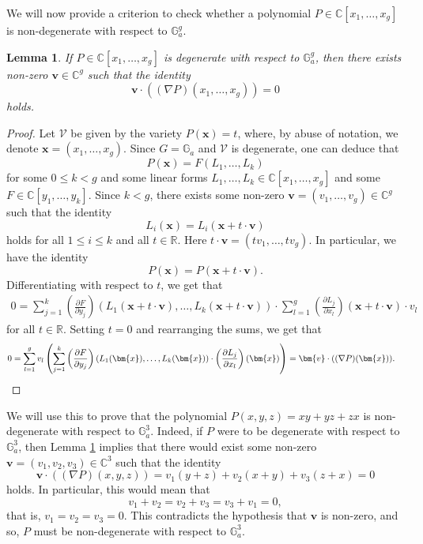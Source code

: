 \documentclass[12pt, reqno]{amsart}
\newcommand{\G}{\mathbb{G}}
\renewcommand{\vec}[1]{\mathbf{#1}}
\renewcommand{\vec}{\bm}
\newtheorem{lemma}[theorem]{Lemma}
\theoremstyle{remark}
\theoremstyle{definition}
\numberwithin{equation}{section}
\begin{document}
We will now provide a criterion to check whether a polynomial $P \in \mathbb{C}[x_1, \dots, x_g]$ is non-degenerate with respect to $\mathbb{G}_a^g$.


\begin{lemma} \label{degenequiv}
    If $P \in \mathbb{C}[x_1, \dots, x_g]$ is degenerate with respect to $\mathbb{G}_a^g$, then there exists non-zero $\vec{v} \in \mathbb{C}^g$ such that the identity
    \[ \vec{v} \cdot (( \nabla P)(x_1, \dots, x_g)) = 0\]
    holds. 
\end{lemma}
\begin{proof}
Let $\mathcal{V}$ be given by the variety $P(\vec{x}) = t$, where, by abuse of notation, we denote $\vec{x} = (x_1, \dots, x_g)$. Since $G = \mathbb{G}_a$ and $\mathcal{V}$ is degenerate, one can deduce that 
\[ P(\vec{x}) = F(L_1, \dots, L_k)\]
for some $0 \leq k < g$ and some linear forms $L_1, \dots, L_k \in \mathbb{C}[x_1, \dots, x_g]$ and some $F \in \mathbb{C}[y_1, \dots, y_k]$. Since $k < g$, there exists some non-zero $\vec{v} = (v_1, \dots, v_g) \in \mathbb{C}^g$ such that the identity 
\[ L_i(\vec{x}) = L_i(\vec{x} + t \cdot \vec{v})\]
holds for all $1 \leq i \leq k$ and all $t \in \mathbb{R}$. Here $t \cdot \vec{v} = (tv_1, \dots, tv_g)$. In particular, we have the identity
\[ P(\vec{x}) = P(\vec{x} + t \cdot \vec{v}).\]
Differentiating with respect to $t$, we get that
\begin{align*}
0   = \sum_{j=1}^k   \left(  \frac{\partial F }{\partial y_j} \right) (L_1 (\vec{x} + t \cdot \vec{v}), \dots, L_k(\vec{x} + t \cdot \vec{v}))  \cdot \sum_{l=1}^g \left( \frac{\partial L_j}{\partial x_l} \right)(\vec{x} + t \cdot \vec{v}) \cdot v_l 
\end{align*}
for all $t \in \mathbb{R}$. Setting $t = 0$ and rearranging the sums, we get that
\begin{align*}
0 & = \sum_{l=1}^g v_l  \left( \sum_{j=1}^k \left( \frac{\partial F }{\partial y_j} \right) (L_1 (\vec{x}), \dots, L_k(\vec{x})) \cdot  \left( \frac{\partial L_j}{\partial x_l} \right)(\vec{x}) \right)  = \vec{v} \cdot ( (\nabla P)(\vec{x})  ). \qedhere
\end{align*}
\end{proof}

We will use this to prove that the polynomial $P(x,y,z) = xy + yz + zx$ is non-degenerate with respect to $\G_a^3$. Indeed, if $P$ were to be degenerate with respect to $\mathbb{G}_a^3$, then Lemma \ref{degenequiv} implies that there would exist some non-zero $\vec{v} = (v_1, v_2, v_3) \in \mathbb{C}^3$ such that the identity
\[ \vec{v}\cdot ( (\nabla P)(x,y,z)  ) = v_1 (y+z) + v_2 (x+y) + v_3(z+x) = 0 \]
holds. In particular, this would mean that
\[ v_1 + v_2 = v_2 + v_3 = v_3 + v_1 = 0,\]
that is, $v_1 = v_2 = v_3 = 0$. This contradicts the hypothesis that $\vec{v}$ is non-zero, and so, $P$ must be non-degenerate with respect to $\G_a^3$.



\end{document}
